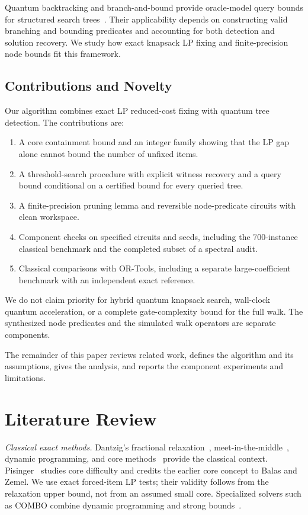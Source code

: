 \documentclass[pdflatex,sn-mathphys-num]{sn-jnl}
\begin{document}
Quantum backtracking and branch-and-bound provide oracle-model query bounds for structured search trees~\cite{ref35,ref24}. Their applicability depends on constructing valid branching and bounding predicates and accounting for both detection and solution recovery. We study how exact knapsack LP fixing and finite-precision node bounds fit this framework.

\subsection{Contributions and Novelty}


Our algorithm combines exact LP reduced-cost fixing with quantum tree detection. The contributions are:
\begin{enumerate}
    \item A core containment bound and an integer family showing that the LP gap alone cannot bound the number of unfixed items.
    \item A threshold-search procedure with explicit witness recovery and a query bound conditional on a certified bound for every queried tree.
    \item A finite-precision pruning lemma and reversible node-predicate circuits with clean workspace.
    \item Component checks on specified circuits and seeds, including the 700-instance classical benchmark and the completed subset of a spectral audit.
    \item Classical comparisons with OR-Tools, including a separate large-coefficient benchmark with an independent exact reference.
\end{enumerate}
We do not claim priority for hybrid quantum knapsack search, wall-clock quantum acceleration, or a complete gate-complexity bound for the full walk. The synthesized node predicates and the simulated walk operators are separate components.

The remainder of this paper reviews related work, defines the algorithm and its assumptions, gives the analysis, and reports the component experiments and limitations.


\section{Literature Review}

\textit{Classical exact methods.} Dantzig's fractional relaxation~\cite{ref1}, meet-in-the-middle~\cite{ref2}, dynamic programming, and core methods~\cite{ref3,ref4} provide the classical context. Pisinger~\cite{ref4} studies core difficulty and credits the earlier core concept to Balas and Zemel. We use exact forced-item LP tests; their validity follows from the relaxation upper bound, not from an assumed small core. Specialized solvers such as COMBO combine dynamic programming and strong bounds~\cite{martello1999combo}.
\end{document}
